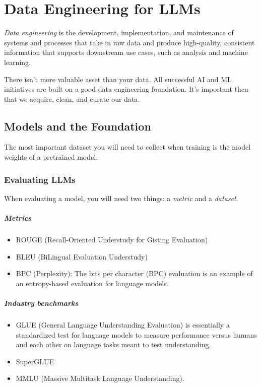 \chapter{Data Engineering for LLMs}

\textit{Data engineering} is the development, implementation, and maintenance of systems and processes that take in raw data and produce high-quality, consistent information that supports downstream use cases, such as analysis and machine learning. 

There isn't more valuable asset than your data. All successful AI and ML initiatives are built on a good data engineering foundation. It's important then that we acquire, clean, and curate our data. 

\section{Models and the Foundation}
The most important dataset you will need to collect when training is the model weights of a pretrained model. 

\subsection{Evaluating LLMs}
When evaluating a model, you will need two things: \Ni a \textit{metric} and \Nii a \textit{dataset}. 

\paragraph{Metrics}
\begin{itemize}
	\item ROUGE (Recall-Oriented Understudy for Gisting Evaluation)
	\item BLEU (BiLingual Evaluation Understudy)
	\item BPC (\eg Perplexity): The bits per character (BPC) evaluation is an example of an entropy-based evaluation for language models. 
\end{itemize}

\paragraph{Industry benchmarks}
\begin{itemize}
	\item GLUE (General Language Understanding Evaluation) is essentially a standardized test for language models to measure performance versus humans and each other on language tasks meant to test understanding. 
	\item SuperGLUE
	\item MMLU (Massive Multitask Language Understanding). 
\end{itemize}

